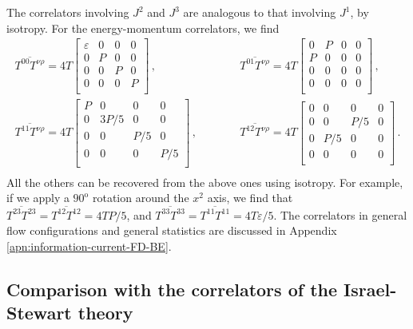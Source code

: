 \documentclass[aps,prd,preprint,nofootinbib,amsmath,amssymb,showpacs,longbibliography,singlecolumn,superscriptaddress,10pt]{revtex4-1}
\theoremstyle{plain}
\theoremstyle{definition}
\begin{document}
The correlators involving $J^2$ and $J^3$ are analogous to that involving $J^1$, by isotropy. For the energy-momentum correlators, we find
\begin{equation}
\begin{split}
    \overline{T^{00} T^{\nu \rho}}=4T
    \begin{bmatrix}
\varepsilon & 0 & 0 & 0 \\
0 & P & 0 & 0 \\
0 & 0 & P & 0 \\
0 & 0 & 0 & P \\
    \end{bmatrix} \, , & \quad \quad \quad 
    \overline{T^{01} T^{\nu \rho}}=4T
    \begin{bmatrix}
0 & P & 0 & 0 \\
P & 0 & 0 & 0 \\
0 & 0 & 0 & 0 \\
0 & 0 & 0 & 0 \\
    \end{bmatrix} \, , \\ 
\overline{T^{11} T^{\nu \rho}}=4T
    \begin{bmatrix}
P & 0 & 0 & 0 \\
0 & 3P/5 & 0 & 0 \\
0 & 0 & P/5 & 0 \\
0 & 0 & 0 & P/5 \\
    \end{bmatrix} \, , & \quad \quad \quad 
    \overline{T^{12} T^{\nu \rho}}=4T
    \begin{bmatrix}
0 & 0 & 0 & 0 \\
0 & 0 & P/5 & 0 \\
0 & P/5 & 0 & 0 \\
0 & 0 & 0 & 0 \\
    \end{bmatrix} \, . \\ 
    \end{split}
\end{equation}
All the others can be recovered from the above ones using isotropy. For example, if we apply a $90^\text{o}$ rotation around the $x^2$ axis, we find that $\overline{T^{23} T^{23}}=\overline{T^{12} T^{12}}=4TP/5$, and $\overline{T^{33} T^{33}}=\overline{T^{11} T^{11}}=4T\varepsilon/5$. The correlators in general flow configurations and general statistics are discussed in Appendix \ref{apn:information-current-FD-BE}.


\subsection{Comparison with the correlators of the Israel-Stewart theory}
\end{document}
